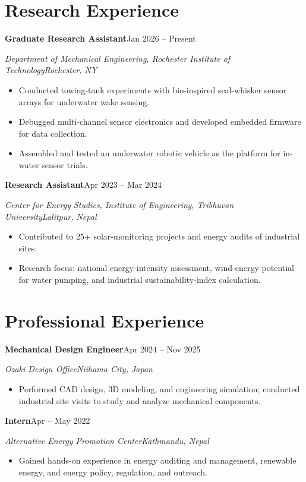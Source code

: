 \documentclass[10pt,letterpaper]{article}
\newcommand{\entry}[4]{\textbf{#1}\hfill #2\par\textit{#3}\hfill\textit{#4}\par}
\begin{document}
\section*{Research Experience}
\entry{Graduate Research Assistant}{Jan 2026 -- Present}{Department of Mechanical Engineering, Rochester Institute of Technology}{Rochester, NY}
\begin{itemize}
  \item Conducted towing-tank experiments with bio-inspired seal-whisker sensor arrays for underwater wake sensing.
  \item Debugged multi-channel sensor electronics and developed embedded firmware for data collection.
  \item Assembled and tested an underwater robotic vehicle as the platform for in-water sensor trials.
\end{itemize}
\entry{Research Assistant}{Apr 2023 -- Mar 2024}{Center for Energy Studies, Institute of Engineering, Tribhuvan University}{Lalitpur, Nepal}
\begin{itemize}
  \item Contributed to 25+ solar-monitoring projects and energy audits of industrial sites.
  \item Research focus: national energy-intensity assessment, wind-energy potential for water pumping, and industrial sustainability-index calculation.
\end{itemize}

\section*{Professional Experience}
\entry{Mechanical Design Engineer}{Apr 2024 -- Nov 2025}{Ozaki Design Office}{Niihama City, Japan}
\begin{itemize}
  \item Performed CAD design, 3D modeling, and engineering simulation; conducted industrial site visits to study and analyze mechanical components.
\end{itemize}
\entry{Intern}{Apr -- May 2022}{Alternative Energy Promotion Center}{Kathmandu, Nepal}
\begin{itemize}
  \item Gained hands-on experience in energy auditing and management, renewable energy, and energy policy, regulation, and outreach.
\end{itemize}
\end{document}
